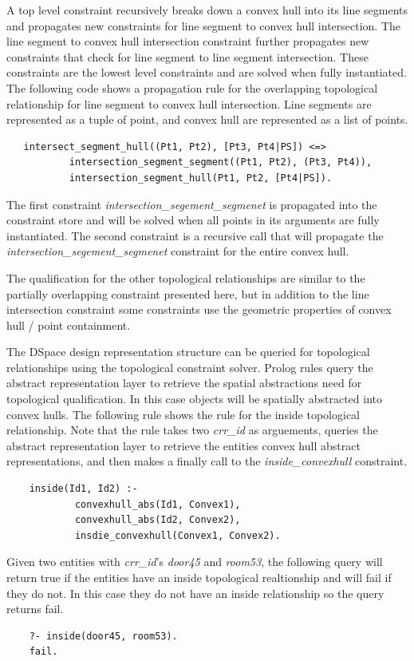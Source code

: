 \documentclass[12pt]{ucthesis}
\begin{document}
A top level constraint recursively breaks down a convex hull into its line segments and propagates new constraints for line segment to convex hull intersection. The line segment to convex hull intersection constraint further propagates new constraints that check for line segment to line segment intersection. These constraints are the lowest level constraints and are solved when fully instantiated. The following code shows a propagation rule for the overlapping topological relationship for line segment to convex hull intersection. Line segments are represented as a tuple of point, and convex hull are represented as a list of points.   
\begin{verbatim}
   intersect_segment_hull((Pt1, Pt2), [Pt3, Pt4|PS]) <=>
           intersection_segment_segment((Pt1, Pt2), (Pt3, Pt4)),
           intersection_segment_hull(Pt1, Pt2, [Pt4|PS]).
\end{verbatim}
The first constraint \emph{intersection\_segement\_segmenet} is propagated into the constraint store and will be solved when all points in its arguments are fully instantiated. The second constraint is a recursive call that will propagate the \emph{intersection\_segement\_segmenet} constraint for the entire convex hull. 

The qualification for the other topological relationships are similar to the partially overlapping constraint presented here, but in addition to the line intersection constraint some constraints use the geometric properties of convex hull / point containment.

The DSpace design representation structure can be queried for topological relationships using the topological constraint solver. Prolog rules query the abstract representation layer to retrieve the spatial abstractions need for topological qualification. In this case objects will be spatially abstracted into convex hulls. The following rule shows the rule for the inside topological relationship. Note that the rule takes two \emph{crr\_id} as arguements, queries the abstract representation layer to retrieve the entities convex hull abstract representations, and then makes a finally call to the \emph{inside\_convexhull} constraint.
\begin{verbatim}
    inside(Id1, Id2) :-
            convexhull_abs(Id1, Convex1),
            convexhull_abs(Id2, Convex2),
            insdie_convexhull(Convex1, Convex2).
\end{verbatim}
Given two entities with \emph{crr\_id}'s \emph{door45} and \emph{room53}, the following query will return true if the entities have an inside topological realtionship and will fail if they do not. In this case they do not have an inside relationship so the query returns fail.
\begin{verbatim}
    ?- inside(door45, room53).
    fail.
\end{verbatim}
\end{document}
